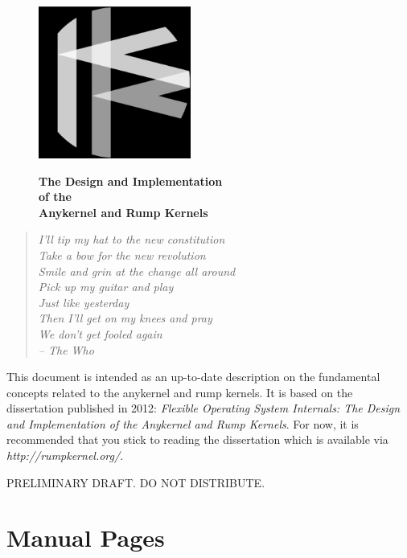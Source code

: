 \documentclass[openright]{tkkdiss}
\begin{document}
\thispagestyle{empty}

\pagecolor{blue}\afterpage{\nopagecolor}
\begin{figure}[t]
\includegraphics[width=5cm]{logo.pdf}

{\color{white} \fontsize{50}{50}\bfseries The Design and Implementation\\
of the\\
Anykernel and Rump Kernels\\
}
\end{figure}

\begin{preface}
\pagecolor{white}

\begin{verse}
\textit{I'll tip my hat to the new constitution\\
Take a bow for the new revolution\\
Smile and grin at the change all around\\
Pick up my guitar and play\\
Just like yesterday\\
Then I'll get on my knees and pray\\
We don't get fooled again\\
-- The Who}
\end{verse}

This document is intended as an up-to-date description on the fundamental
concepts related to the anykernel and rump kernels.  It is based on
the dissertation published in 2012: \textit{Flexible Operating System
Internals: The Design and Implementation of the Anykernel and Rump
Kernels}.  For now, it is recommended that you stick to reading the
dissertation which is available via \textit{http://rumpkernel.org/}.

{\large PRELIMINARY DRAFT.  DO NOT DISTRIBUTE.}

\end{preface}


\tableofcontents


\begin{listofabbreviations}

\printnomenclature[5cm]

\end{listofabbreviations}


\listoffigures
\listoftables









\appendix


\section{Manual Pages}
\manpagetoc


\end{document}
